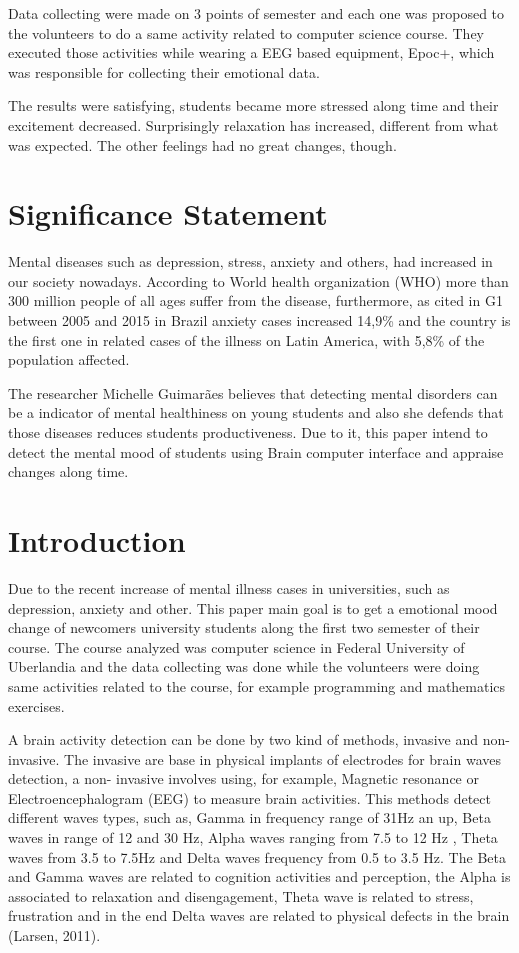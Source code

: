 \documentclass[12pt,openright,a4paper]{article}
\begin{document}
Data collecting were made on 3 points of semester and each one was proposed to the volunteers to do a same activity related to computer science course. They executed those activities  while wearing a EEG based equipment, Epoc+, which was responsible for collecting their emotional data.

The results were satisfying,  students became more stressed along time and their excitement decreased.     Surprisingly relaxation has increased, different from what was expected. The other feelings had no great changes, though.
\section{Significance Statement}
Mental diseases such as depression, stress, anxiety and others, had increased in our society nowadays.  According to World health organization (WHO)  more than 300 million people of all ages suffer from the disease, furthermore, as cited in G1 between 2005 and 2015 in Brazil anxiety cases increased 14,9\% and the country is the first one in related cases of the illness on Latin America, with 5,8\% of the population affected. 

The researcher Michelle Guimarães believes that detecting mental disorders can be a indicator of mental healthiness on young students and also she defends that those diseases reduces students productiveness. Due to it, this paper intend to detect the mental mood of students using Brain computer interface and appraise changes along time.  
\section{Introduction}
Due to the recent increase of mental illness cases in universities, such as depression, anxiety and other. This paper main goal is to get a emotional mood change of newcomers university students along the first two semester of their course. The course analyzed was computer science in Federal University of Uberlandia and the data collecting was done while the volunteers were doing same activities related to the course, for example programming and mathematics exercises.

A brain activity detection can be done by two kind of methods, invasive and non-invasive. The invasive  are base in physical implants of electrodes for brain waves detection, a non- invasive involves using, for example, Magnetic resonance or Electroencephalogram (EEG) to measure brain activities. This methods detect different waves types, such as, Gamma in frequency range of 31Hz  an up, Beta waves in range of 12 and 30 Hz, Alpha waves ranging from 7.5 to 12 Hz , Theta waves from 3.5 to 7.5Hz and Delta waves frequency from 0.5 to 3.5 Hz. The Beta and Gamma waves are related to cognition activities and perception, the Alpha is associated to relaxation and disengagement, Theta wave is related to stress, frustration and in the end Delta waves are related to physical defects in the brain (Larsen, 2011).
\end{document}
